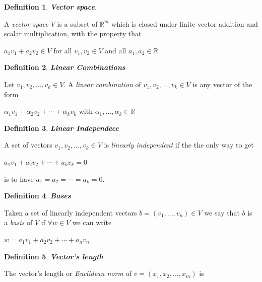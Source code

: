 \documentclass[a4paper,12pt]{report}
\newtheorem{definition}{Definition}[section]
\newcommand{\R}{\mathbb{R}}
\begin{document}
\begin{definition}
    \textbf{Vector space}.
\end{definition}
A \textit{vector space} $V$ is a subset of $\R^{m}$ which is closed under finite vector addition and scalar multiplication, with the property that

\begin{center}
   $a_1v_1 + a_2v_2 \in V$ for all $v_1,v_2 \in V$ and all $a_1,a_2 \in \R$
\end{center}

\begin{definition}
    \textbf{Linear Combinations}
\end{definition}

Let $v_1,v_2,\ldots,v_k \in V$. A \textit{linear combination} of $v_1,v_2,\ldots,v_k \in V$ is any vector of the form

\begin{center}
    $\alpha_1v_1 + \alpha_2v_2 + \cdots + \alpha_kv_k$ with $\alpha_1, \ldots, \alpha_k \in \R$
\end{center}

\begin{definition}
    \textbf{Linear Independece}
\end{definition}

A set of vectors $v_1,v_2,\ldots,v_k \in V$ is \textit{linearly independent} if the the only way to get

\begin{center}
    $a_1v_1 + a_2v_2 + \cdots + a_kv_k = 0$
\end{center}

is to have $a_1 = a_2 = \cdots = a_k = 0$.

\begin{definition}
    \textbf{Bases}
\end{definition}

Taken a set of linearly independent vectors $b = (v_1,\ldots,v_n) \in V$ we say that $b$ is a \textit{basis} of $V$ if $\forall w \in V$ we can write

\begin{center}
    $w = a_1v_1 + a_2v_2 + \cdots + a_nv_n$
\end{center}

\begin{definition}
    \textbf{Vector's length}
\end{definition}

The vector's length or \textit{Euclidean norm} of $v = (x_1, x_2, \ldots, x_m)$ is
\end{document}

